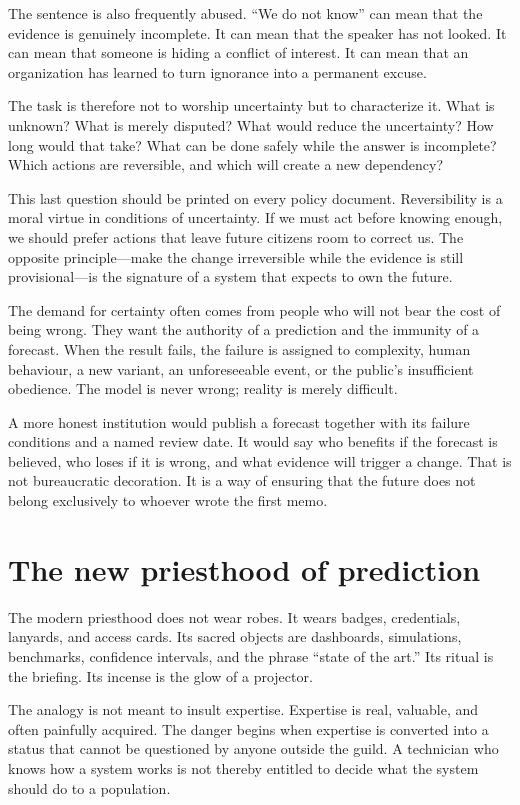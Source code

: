 ﻿\documentclass[12pt,a4paper]{book}
\begin{document}
The sentence is also frequently abused. ``We do not know'' can mean that the
evidence is genuinely incomplete. It can mean that the speaker has not looked.
It can mean that someone is hiding a conflict of interest. It can mean that an
organization has learned to turn ignorance into a permanent excuse.

The task is therefore not to worship uncertainty but to characterize it. What
is unknown? What is merely disputed? What would reduce the uncertainty? How
long would that take? What can be done safely while the answer is incomplete?
Which actions are reversible, and which will create a new dependency?

This last question should be printed on every policy document. Reversibility
is a moral virtue in conditions of uncertainty. If we must act before knowing
enough, we should prefer actions that leave future citizens room to correct us.
The opposite principle—make the change irreversible while the evidence is
still provisional—is the signature of a system that expects to own the future.

The demand for certainty often comes from people who will not bear the cost of
being wrong. They want the authority of a prediction and the immunity of a
forecast. When the result fails, the failure is assigned to complexity, human
behaviour, a new variant, an unforeseeable event, or the public's insufficient
obedience. The model is never wrong; reality is merely difficult.

A more honest institution would publish a forecast together with its failure
conditions and a named review date. It would say who benefits if the forecast
is believed, who loses if it is wrong, and what evidence will trigger a change.
That is not bureaucratic decoration. It is a way of ensuring that the future
does not belong exclusively to whoever wrote the first memo.

\section{The new priesthood of prediction}

The modern priesthood does not wear robes. It wears badges, credentials,
lanyards, and access cards. Its sacred objects are dashboards, simulations,
benchmarks, confidence intervals, and the phrase ``state of the art.'' Its
ritual is the briefing. Its incense is the glow of a projector.

The analogy is not meant to insult expertise. Expertise is real, valuable,
and often painfully acquired. The danger begins when expertise is converted
into a status that cannot be questioned by anyone outside the guild. A
technician who knows how a system works is not thereby entitled to decide what
the system should do to a population.
\end{document}
